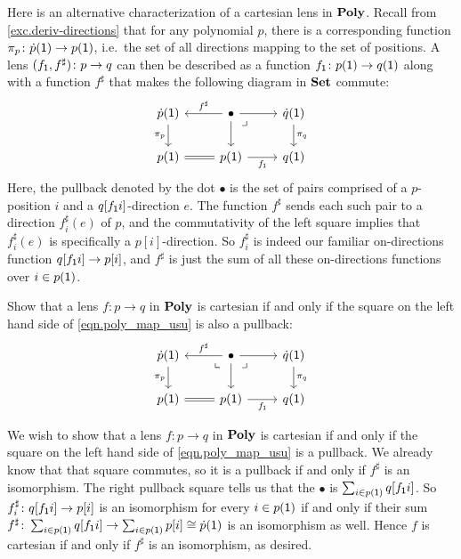 \documentclass[Book-Poly]{subfiles}
\begin{document}
Here is an alternative characterization of a cartesian lens in $\mathbf{Poly}$.
Recall from \cref{exc.deriv-directions} that for any polynomial $p$, there is a corresponding function $\pi_p\colon\dot{p}(\textsf{1})\to p(\textsf{1})$, i.e.\ the set of all directions mapping to the set of positions.
A lens $(f_{\textsf{1}},f^\sharp)\colon p\to q$ can then be described as a function $f_{\textsf{1}}\colon p(\textsf{1})\to q(\textsf{1})$ along with a function $f^\sharp$ that makes the following diagram in $\mathbf{Set}$ commute:
\begin{equation}\label{eqn.poly_map_usu}
\begin{tikzcd}
	\dot{p}(\1)\ar[d, "\pi_p"']&
	\bullet\ar[l, "f^\sharp"']\ar[r]\ar[d]&
	\dot{q}(\1)\ar[d, "\pi_q"]\\
	p(\1)\ar[r, equal]&
	p(\1)\ar[r, "f_\1"']&
	q(\1)\ar[ul, phantom, very near end, "\lrcorner"]
\end{tikzcd}
\end{equation}
Here, the pullback denoted by the dot $\bullet$ is the set of pairs comprised of a $p$-position $i$ and a $q[f_{\textsf{1}}i]$-direction $e$.
The function $f^\sharp$ sends each such pair to a direction $f^\sharp_i(e)$ of $p$, and the commutativity of the left square implies that $f^\sharp_i(e)$ is specifically a $p[i]$-direction.
So $f^\sharp_i$ is indeed our familiar on-directions function $q[f_{\textsf{1}}i]\to p[i]$, and $f^\sharp$ is just the sum of all these on-directions functions over $i\in p(\textsf{1})$.


\begin{exercise} \label{exc.cart_pullbacks}
Show that a lens $f\colon p\to q$ in $\mathbf{Poly}$ is cartesian if and only if the square on the left hand side of \eqref{eqn.poly_map_usu} is also a pullback:
\[
\begin{tikzcd}
	\dot{p}(\1)\ar[d, "\pi_p"']&
	\bullet\ar[l, "f^\sharp"']\ar[r]\ar[d]&
	\dot{q}(\1)\ar[d, "\pi_q"]\\
	p(\1)\ar[r, equal]\ar[ur, phantom, very near end, "\llcorner"]&
	p(\1)\ar[r, "f_\1"']&
	q(\1)\ar[ul, phantom, very near end, "\lrcorner"]
\end{tikzcd}
\]
\begin{solution}
We wish to show that a lens $f\colon p\to q$ in $\mathbf{Poly}$ is cartesian if and only if the square on the left hand side of \eqref{eqn.poly_map_usu} is a pullback.
We already know that that square commutes, so it is a pullback if and only if $f^\sharp$ is an isomorphism.
The right pullback square tells us that the $\bullet$ is $\sum_{i\in p(\textsf{1})}q[f_{\textsf{1}}i]$.
So $f^\sharp_i\colon q[f_{\textsf{1}}i]\to p[i]$ is an isomorphism for every $i\in p(\textsf{1})$ if and only if their sum $f^\sharp\colon\sum_{i\in p(\textsf{1})}q[f_{\textsf{1}}i]\to\sum_{i\in p(\textsf{1})}p[i]\cong\dot{p}(\textsf{1})$ is an isomorphism as well.
Hence $f$ is cartesian if and only if $f^\sharp$ is an isomorphism, as desired.
\end{solution}
\end{exercise}
\end{document}
